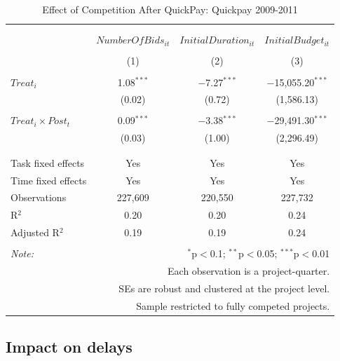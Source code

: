 \documentclass[
]{article}
\begin{document}
\begin{table}[H] \centering 
  \caption{Effect of Competition After QuickPay: Quickpay 2009-2011} 
  \label{} 
\small 
\begin{tabular}{@{\extracolsep{0pt}}lccc} 
\\[-1.8ex]\hline 
\hline \\[-1.8ex] 
\\[-1.8ex] & $NumberOfBids_{it}$ & $InitialDuration_{it}$ & $InitialBudget_{it}$ \\ 
\\[-1.8ex] & (1) & (2) & (3)\\ 
\hline \\[-1.8ex] 
 $Treat_i$ & 1.08$^{***}$ & $-$7.27$^{***}$ & $-$15,055.20$^{***}$ \\ 
  & (0.02) & (0.72) & (1,586.13) \\ 
  & & & \\ 
 $Treat_i \times Post_t$ & 0.09$^{***}$ & $-$3.38$^{***}$ & $-$29,491.30$^{***}$ \\ 
  & (0.03) & (1.00) & (2,296.49) \\ 
  & & & \\ 
\hline \\[-1.8ex] 
Task fixed effects & Yes & Yes & Yes \\ 
Time fixed effects & Yes & Yes & Yes \\ 
Observations & 227,609 & 220,550 & 227,732 \\ 
R$^{2}$ & 0.20 & 0.20 & 0.24 \\ 
Adjusted R$^{2}$ & 0.19 & 0.19 & 0.24 \\ 
\hline 
\hline \\[-1.8ex] 
\textit{Note:}  & \multicolumn{3}{r}{$^{*}$p$<$0.1; $^{**}$p$<$0.05; $^{***}$p$<$0.01} \\ 
 & \multicolumn{3}{r}{Each observation is a project-quarter.} \\ 
 & \multicolumn{3}{r}{SEs are robust and clustered at the project level.} \\ 
 & \multicolumn{3}{r}{Sample restricted to fully competed projects.} \\ 
\end{tabular} 
\end{table}

\hypertarget{impact-on-delays}{%
\subsection{Impact on delays}\label{impact-on-delays}}
\end{document}
